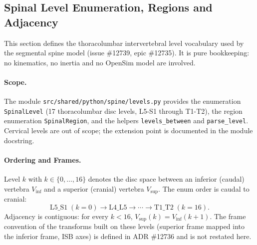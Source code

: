 \subsection{Spinal Level Enumeration, Regions and Adjacency}
\label{sec:spn-1a}

This section defines the thoracolumbar intervertebral level vocabulary used by
the segmental spine model (issue \#12739, epic \#12735). It is pure
bookkeeping: no kinematics, no inertia and no OpenSim model are involved.

\paragraph{Scope.}
The module \texttt{src/shared/python/spine/levels.py} provides the enumeration
\texttt{SpinalLevel} (17 thoracolumbar disc levels, L5-S1 through T1-T2), the
region enumeration \texttt{SpinalRegion}, and the helpers
\texttt{levels\_between} and \texttt{parse\_level}. Cervical levels are out of
scope; the extension point is documented in the module docstring.

\paragraph{Ordering and Frames.}
Level $k$ with $k \in \{0,\dots,16\}$ denotes the disc space between an
inferior (caudal) vertebra $V_{\mathrm{inf}}$ and a superior (cranial)
vertebra $V_{\mathrm{sup}}$. The enum order is caudal to cranial:
\[
  \mathrm{L5\_S1} \;(k{=}0) \rightarrow \mathrm{L4\_L5} \rightarrow \cdots
  \rightarrow \mathrm{T1\_T2}\;(k{=}16).
\]
Adjacency is contiguous: for every $k < 16$,
$V_{\mathrm{sup}}(k) = V_{\mathrm{inf}}(k+1)$. The frame convention of the
transforms built on these levels (superior frame mapped into the inferior
frame, ISB axes) is defined in ADR \#12736 and is not restated here.

